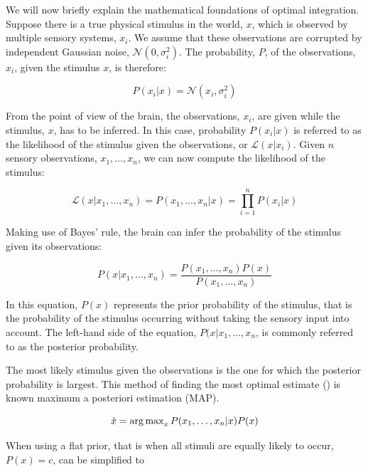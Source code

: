 We will now briefly explain the mathematical foundations of optimal integration. Suppose there is a true physical stimulus in the world, $x$, which is observed by multiple sensory systems, $x_i$. We assume that these observations are corrupted by independent Gaussian noise, $\mathcal{N}(0, \sigma_i^2)$. The probability, $P$, of the observations, $x_i$, given the stimulus $x$, is therefore:

\begin{equation}
P(x_i|x)= \mathcal{N}(x_i, \sigma_i^2)
\end{equation}

From the point of view of the brain, the observations, $x_i$, are given while the stimulus, $x$, has to be inferred. In this case, probability $P(x_i|x)$ is referred to as the likelihood of the stimulus given the observations, or $\mathcal{L}(x|x_i)$. Given $n$ sensory observations, $x_1,\dotsc,x_n$, we can now compute the likelihood of the stimulus:

\begin{equation}
\mathcal{L}(x|x_1,\dotsc,x_n) = P(x_1,\dotsc,x_n|x) = \prod_{i=1}^n P(x_i|x)
\end{equation}

Making use of Bayes' rule, the brain can infer the probability of the stimulus given its observations:

\begin{equation}
P(x|x_1,\dotsc,x_n) = \frac{P(x_1,\dotsc,x_n)P(x)}{P(x_1,\dotsc,x_n)}
\end{equation}

In this equation, $P(x)$ represents the prior probability of the stimulus, that is the probability of the stimulus occurring without taking the sensory input into account. The left-hand side of the equation, $P(x|x_1,\dotsc,x_n$, is commonly referred to as the posterior probability.

The most likely stimulus given the observations is  the one for which the posterior probability is largest. This method of finding the most optimal estimate () is known maximum a posteriori estimation (MAP).

\begin{equation}
\hat{x} = \operatorname{arg\,max}_x P(x_1,\dotsc,x_n|x)P(x)
\label{intro:eq:map}
\end{equation}

When using a flat prior, that is when all stimuli are equally likely to occur, $P(x)=c$,  can be simplified to

